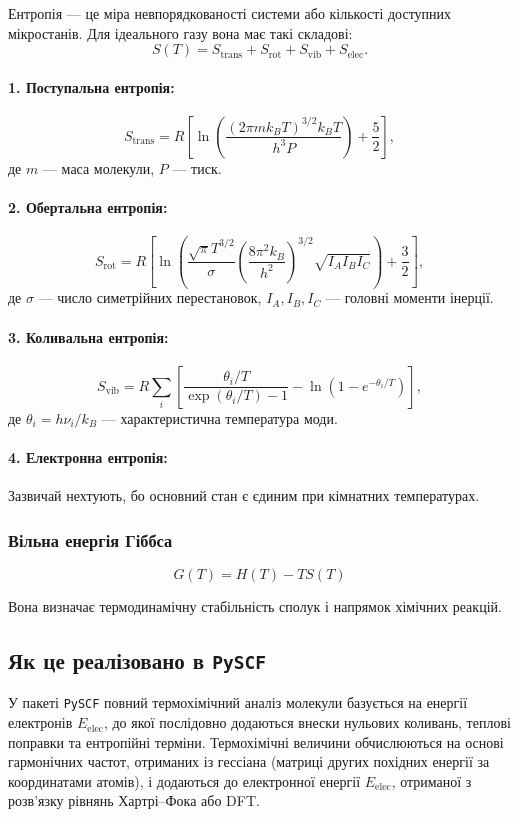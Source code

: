 Ентропія --- це міра невпорядкованості системи або кількості доступних мікростанів.
Для ідеального газу вона має такі складові:
\[
    S(T) = S_{\text{trans}} + S_{\text{rot}} + S_{\text{vib}} + S_{\text{elec}}.
\]

\paragraph{1. Поступальна ентропія:}
\[
    S_{\text{trans}} = R\left[
        \ln\!\left(\frac{(2\pi m k_BT)^{3/2}k_BT}{h^3 P}\right) + \frac{5}{2}
    \right],
\]
де $m$ --- маса молекули, $P$ --- тиск.

\paragraph{2. Обертальна ентропія:}
\[
    S_{\text{rot}} = R\left[
        \ln\!\left(
        \frac{\sqrt{\pi}T^{3/2}}{\sigma}
        \left(\frac{8\pi^2k_B}{h^2}\right)^{3/2}
        \sqrt{I_A I_B I_C}
        \right) + \frac{3}{2}
    \right],
\]
де $\sigma$ --- число симетрійних перестановок, $I_A,I_B,I_C$ --- головні моменти інерції.

\paragraph{3. Коливальна ентропія:}
\[
    S_{\text{vib}} = R \sum_i
        \left[
            \frac{\theta_i/T}{\exp(\theta_i/T) - 1}
            - \ln\!\left(1 - e^{-\theta_i/T}\right)
        \right],
\]
де $\theta_i = h\nu_i/k_B$ --- характеристична температура моди.

\paragraph{4. Електронна ентропія:}
Зазвичай нехтують, бо основний стан є єдиним при кімнатних температурах.


\subsubsection{Вільна енергія Гіббса}

\[
    G(T) = H(T) - TS(T)
\]

Вона визначає термодинамічну стабільність сполук
і напрямок хімічних реакцій.

\subsection{Як це реалізовано в \texttt{PySCF}}
У пакеті \texttt{PySCF} повний термохімічний аналіз молекули базується
на енергії електронів $E_{\text{elec}}$, до якої послідовно додаються
внески нульових коливань, теплові поправки та ентропійні терміни. Термохімічні величини обчислюються
на основі гармонічних частот, отриманих із гессіана
(матриці других похідних енергії за координатами атомів),
і додаються до електронної енергії $E_{\text{elec}}$,
отриманої з розв’язку рівнянь Хартрі–Фока або DFT.

